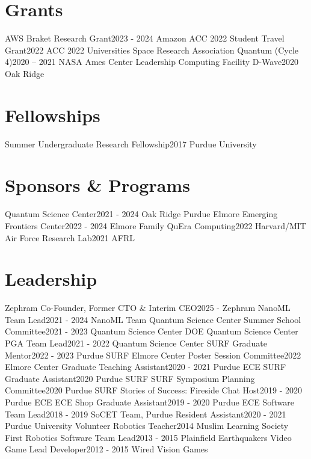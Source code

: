 \section{Grants}
  \resumeSubHeadingListStart
    \resumeSubheading
      {AWS Braket Research Grant}{2023 - 2024}
      {Amazon}{}
    \resumeSubheading
      {ACC 2022 Student Travel Grant}{2022}
      {ACC 2022}{}
    \resumeSubheading
      {Universities Space Research Association Quantum (Cycle 4)}{2020 – 2021}
      {NASA Ames Center}{}
    \resumeSubheading
      {Leadership Computing Facility D-Wave}{2020}
      {Oak Ridge}{}
  \resumeSubHeadingListEnd
\section{Fellowships}
  \resumeSubHeadingListStart
    \resumeSubheading
      {Summer Undergraduate Research Fellowship}{2017}
      {Purdue University}{}
  \resumeSubHeadingListEnd
\section{Sponsors \& Programs}
  \resumeSubHeadingListStart
    \resumeSubheading
      {Quantum Science Center}{2021 - 2024}
      {Oak Ridge}{}
    \resumeSubheading
      {Purdue Elmore Emerging Frontiers Center}{2022 - 2024}
      {Elmore Family}{}
    \resumeSubheading
      {QuEra Computing}{2022}
      {Harvard/MIT}{}
    \resumeSubheading
      {Air Force Research Lab}{2021}
      {AFRL}{}
  \resumeSubHeadingListEnd
\section{Leadership}
  \resumeSubHeadingListStart
    \resumeSubheading
      {Zephram Co-Founder, Former CTO \& Interim CEO}{2025 - }
      {Zephram}{}
    \resumeSubheading
      {NanoML Team Lead}{2021 - 2024}
      {NanoML Team}{}
    \resumeSubheading
      {Quantum Science Center Summer School Committee}{2021 - 2023}
      {Quantum Science Center}{}
    \resumeSubheading
      {DOE Quantum Science Center PGA Team Lead}{2021 - 2022}
      {Quantum Science Center}{}
    \resumeSubheading
      {SURF Graduate Mentor}{2022 - 2023}
      {Purdue SURF}{}
    \resumeSubheading
      {Elmore Center Poster Session Committee}{2022}
      {Elmore Center}{}
    \resumeSubheading
      {Graduate Teaching Assistant}{2020 - 2021}
      {Purdue ECE}{}
    \resumeSubheading
      {SURF Graduate Assistant}{2020}
      {Purdue SURF}{}
    \resumeSubheading
      {SURF Symposium Planning Committee}{2020}
      {Purdue SURF}{}
    \resumeSubheading
      {Stories of Success: Fireside Chat Host}{2019 - 2020}
      {Purdue ECE}{}
    \resumeSubheading
      {ECE Shop Graduate Assistant}{2019 - 2020}
      {Purdue ECE}{}
    \resumeSubheading
      {Software Team Lead}{2018 - 2019}
      {SoCET Team, Purdue}{}
    \resumeSubheading
      {Resident Assistant}{2020 - 2021}
      {Purdue University}{}
    \resumeSubheading
      {Volunteer Robotics Teacher}{2014}
      {Muslim Learning Society}{}
    \resumeSubheading
      {First Robotics Software Team Lead}{2013 - 2015}
      {Plainfield Earthquakers}{}
    \resumeSubheading
      {Video Game Lead Developer}{2012 - 2015}
      {Wired Vision Games}{}
  \resumeSubHeadingListEnd
